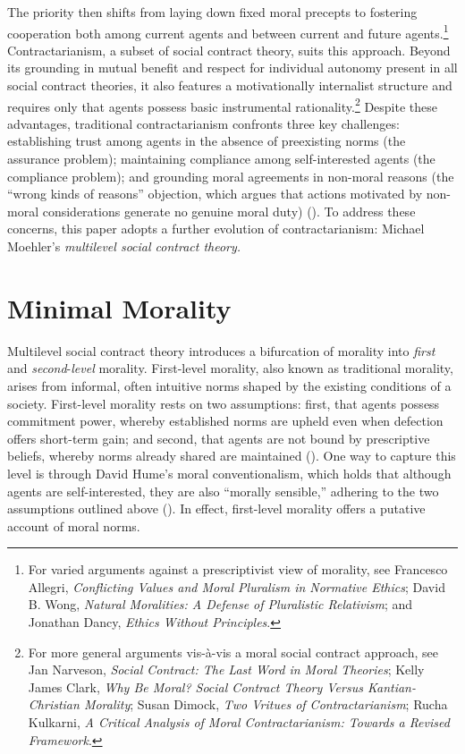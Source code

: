 The priority then shifts from laying down fixed moral precepts to fostering cooperation both among current agents and between current and future agents.\footnote{For varied arguments against a prescriptivist view of morality, see Francesco Allegri, \emph{Conflicting Values and Moral Pluralism in Normative Ethics}; David B. Wong, \emph{Natural Moralities: A Defense of Pluralistic Relativism}; and Jonathan Dancy, \emph{Ethics Without Principles}.} Contractarianism, a subset of social contract theory, suits this approach. Beyond its grounding in mutual benefit and respect for individual autonomy present in all social contract theories, it also features a motivationally internalist structure and requires only that agents possess basic instrumental rationality.\footnote{For more general arguments vis-à-vis a moral social contract approach, see Jan Narveson, \emph{Social Contract: The Last Word in Moral Theories}; Kelly James Clark, \emph{Why Be Moral? Social Contract Theory Versus Kantian-Christian Morality}; Susan Dimock, \emph{Two Vritues of Contractarianism}; Rucha Kulkarni, \emph{A Critical Analysis of Moral Contractarianism: Towards a Revised Framework}.} Despite these advantages, traditional contractarianism confronts three key challenges: establishing trust among agents in the absence of preexisting norms (the assurance problem); maintaining compliance among self-interested agents (the compliance problem); and grounding moral agreements in non-moral reasons (the “wrong kinds of reasons” objection, which argues that actions motivated by non-moral considerations generate no genuine moral duty) (\cites[pp.\ 3–4]{kogelmann2019}[pp.\ 347]{sayremccord2013}[pp.\ 15–16]{moehler2020contractarianism}{prichard1912}). To address these concerns, this paper adopts a further evolution of contractarianism: Michael Moehler’s \emph{multilevel social contract theory.}

\section{Minimal Morality}
\label{sec:minimal_morality}

Multilevel social contract theory introduces a bifurcation of morality into \emph{first} and \emph{second}-\emph{level} morality. First-level morality, also known as traditional morality, arises from informal, often intuitive norms shaped by the existing conditions of a society. First-level morality rests on two assumptions: first, that agents possess commitment power, whereby established norms are upheld even when defection offers short-term gain; and second, that agents are not bound by prescriptive beliefs, whereby norms already shared are maintained (\cites[pp.\ 5–6]{moehler2020contractarianism}[p.\ 229]{moehler2024diversity}). One way to capture this level is through David Hume’s moral conventionalism, which holds that although agents are self-interested, they are also “morally sensible,” adhering to the two assumptions outlined above (\cites{hume1998}[pp.\ 232-233]{moehler2024diversity}). In effect, first-level morality offers a putative account of moral norms.


